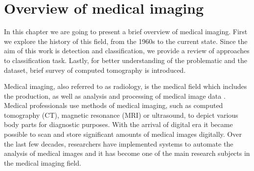 \chapter{Overview of medical imaging}
In this chapter we are going to present a brief overview of medical imaging. First we explore the history of this field, from the 1960s to the current state. Since the aim of this work is detection and classification, we provide a review of approaches to classification task. Lastly, for better understanding of the problematic and the dataset, brief survey of computed tomography is introduced.

Medical imaging, also referred to as radiology, is the medical field which includes the production, as well as analysis and processing of medical image data \cite{diagnostic50years}. Medical professionals use methods of medical imaging, such as computed tomography (CT), magnetic resonance (MRI) or ultrasound, to depict various body parts for diagnostic purposes. With the arrival of digital era it became possible to scan and store significant amounts of medical images digitally. Over the last few decades, researchers have implemented systems to automate the analysis of medical images and it has become one of the main research subjects in the medical imaging field. 

